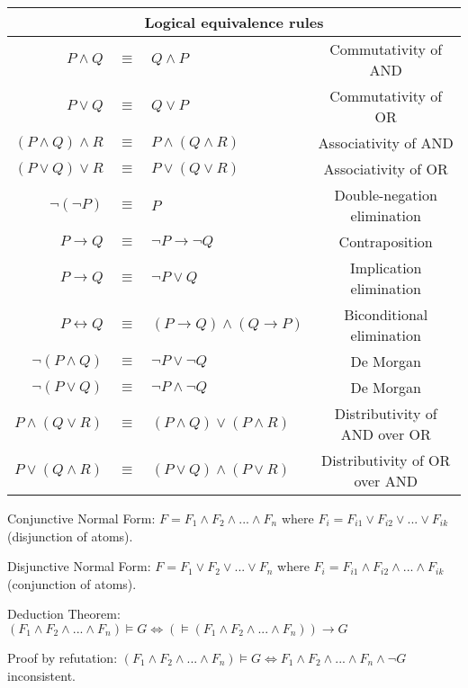 \documentclass[]{article}
\begin{document}
\begin{table}[h]
	\centering
	\begin{tabular}{ | r  c  l  c | } 
		\hline
		\multicolumn{4}{|c|}{Logical equivalence rules} \\
		\hline
		$P \land Q$ & $\equiv$ & $Q \land P$ & Commutativity of AND\\
		\hline
		$P \lor Q$ & $\equiv$ & $Q \lor P$ & Commutativity of OR\\
		\hline
		$(P \land Q) \land R$ & $\equiv$ & $P \land (Q \land R)$ & Associativity of AND\\
		\hline
		$(P \lor Q) \lor R$ & $\equiv$ & $P \lor (Q \lor R)$ & Associativity of OR\\
		\hline
		$\neg(\neg P)$ & $\equiv$ & $P$ & Double-negation elimination\\
		\hline
		$P \rightarrow Q$ & $\equiv$ & $\neg P \rightarrow \neg Q$ & Contraposition\\
		\hline
		$P \rightarrow Q$ & $\equiv$ & $\neg P \lor Q$ & Implication elimination\\
		\hline
		$P \leftrightarrow Q$ & $\equiv$ & $(P \rightarrow Q) \land (Q \rightarrow P)$ & Biconditional elimination \\
		\hline
		$\neg(P \land Q)$ & $\equiv$ & $\neg P \lor \neg Q$ & De Morgan\\
		\hline
		$\neg(P \lor Q)$ & $\equiv$ & $\neg P \land \neg Q$ & De Morgan\\
		\hline
		$P \land (Q \lor R)$ & $\equiv$ & $(P \land Q) \lor (P \land R)$ & Distributivity of AND over OR\\
		\hline
		$P \lor (Q \land R)$ & $\equiv$ & $(P \lor Q) \land (P \lor R)$ & Distributivity of OR over AND\\
		\hline
	\end{tabular}
\end{table}

\noindent Conjunctive Normal Form: $F = F_1 \land F_2 \land ... \land F_n $ where $F_i = F_{i1} \lor F_{i2} \lor ... \lor F_{ik} $ (disjunction of atoms).

\noindent Disjunctive Normal Form: $F = F_1 \lor F_2 \lor ... \lor F_n $ where $F_i = F_{i1} \land F_{i2} \land ... \land F_{ik} $ (conjunction of atoms).

\noindent Deduction Theorem: $(F_1 \land F_2 \land ... \land F_n) \vDash G \iff (\vDash(F_1 \land F_2 \land ... \land F_n)) \rightarrow G$

\noindent Proof by refutation: $(F_1 \land F_2 \land ... \land F_n) \vDash G \iff F_1 \land F_2 \land ... \land F_n \land \neg G $ inconsistent.
\end{document}
